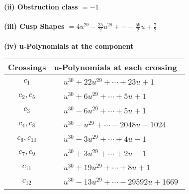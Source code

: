\documentclass[1p]{elsarticle_modified}
\theoremstyle{definition}
\begin{document}
\flushleft \textbf{(ii) Obstruction class $= -1$}\\~\\
\flushleft \textbf{(iii) Cusp Shapes $= 4 u^{29}-\frac{25}{2} u^{28}+\cdots-\frac{59}{2} u+\frac{7}{2}$}\\~\\
\newpage\renewcommand{\arraystretch}{1}
\flushleft \textbf{(iv) u-Polynomials at the component}\newline \\
\begin{tabular}{m{50pt}|m{274pt}}
Crossings & \hspace{64pt}u-Polynomials at each crossing \\
\hline $$\begin{aligned}c_{1}\end{aligned}$$&$\begin{aligned}
&u^{30}+22 u^{29}+\cdots+23 u+1
\end{aligned}$\\
\hline $$\begin{aligned}c_{2},c_{5}\end{aligned}$$&$\begin{aligned}
&u^{30}+6 u^{29}+\cdots+5 u+1
\end{aligned}$\\
\hline $$\begin{aligned}c_{3}\end{aligned}$$&$\begin{aligned}
&u^{30}-6 u^{29}+\cdots+5 u+1
\end{aligned}$\\
\hline $$\begin{aligned}c_{4},c_{8}\end{aligned}$$&$\begin{aligned}
&u^{30}- u^{29}+\cdots-2048 u-1024
\end{aligned}$\\
\hline $$\begin{aligned}c_{6},c_{10}\end{aligned}$$&$\begin{aligned}
&u^{30}-3 u^{29}+\cdots+4 u-1
\end{aligned}$\\
\hline $$\begin{aligned}c_{7},c_{9}\end{aligned}$$&$\begin{aligned}
&u^{30}+3 u^{29}+\cdots+2 u-1
\end{aligned}$\\
\hline $$\begin{aligned}c_{11}\end{aligned}$$&$\begin{aligned}
&u^{30}+19 u^{29}+\cdots+8 u+1
\end{aligned}$\\
\hline $$\begin{aligned}c_{12}\end{aligned}$$&$\begin{aligned}
&u^{30}-13 u^{29}+\cdots-29592 u+1669
\end{aligned}$\\
\hline
\end{tabular}\\~\\
\end{document}
